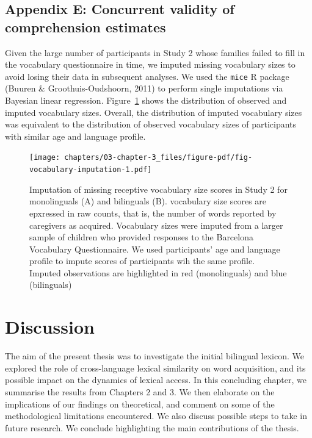 \documentclass[
  12pt,
  b5paperpaper,
  twoside]{scrreprt}
\begin{document}
\newpage{}

\hypertarget{appendix-e-concurrent-validity-of-comprehension-estimates}{%
\section{Appendix E: Concurrent validity of comprehension
estimates}\label{appendix-e-concurrent-validity-of-comprehension-estimates}}

Given the large number of participants in Study 2 whose families failed
to fill in the vocabulary questionnaire in time, we imputed missing
vocabulary sizes to avoid losing their data in subsequent analyses. We
used the \texttt{mice} R package (Buuren \& Groothuis-Oudshoorn, 2011)
to perform single imputations via Bayesian linear regression.
Figure~\ref{fig-vocabulary-imputation} shows the distribution of
observed and imputed vocabulary sizes. Overall, the distribution of
imputed vocabulary sizes was equivalent to the distribution of observed
vocabulary sizes of participants with similar age and language profile.

\begin{figure}

{\centering \texttt{[image: chapters/03-chapter-3\_files/figure-pdf/fig-vocabulary-imputation-1.pdf]}

}

\caption{\label{fig-vocabulary-imputation}Imputation of missing
receptive vocabulary size scores in Study 2 for monolinguals (A) and
bilinguals (B). vocabulary size scores are epxressed in raw counts, that
is, the number of words reported by caregivers as acquired. Vocabulary
sizes were imputed from a larger sample of children who provided
responses to the Barcelona Vocabulary Questionnaire. We used
participants' age and language profile to impute scores of participants
wih the same profile. Imputed observations are highlighted in red
(monolinguals) and blue (bilinguals)}

\end{figure}

\newpage{}


\hypertarget{discussion-2}{%
\chapter{Discussion}\label{discussion-2}}

The aim of the present thesis was to investigate the initial bilingual
lexicon. We explored the role of cross-language lexical similarity on
word acquisition, and its possible impact on the dynamics of lexical
access. In this concluding chapter, we summarise the results from
Chapters 2 and 3. We then elaborate on the implications of our findings
on theoretical, and comment on some of the methodological limitations
encountered. We also discuss possible steps to take in future research.
We conclude highlighting the main contributions of the thesis.
\end{document}
